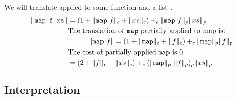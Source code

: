 %
We will translate  applied to some function  and a list .
%
\begin{align*}
  \|\T{map f xs}\| &= (1 + \|\T{map}\ f\|_c + \|xs\|_c) +_c \|\T{map}\ f\|_p \|xs\|_p \\
                   &\text{The translation of \T{map} partially applied to map is:}\\
                   &\quadthree \|\T{map}\ f\| = (1 + \|\T{map}\|_c + \|f\|_c) +_c \|\T{map}\|_p \|f\|_p \\
                   &\text{The cost of partially applied \T{map} is 0.} \\
                   &= (2 + \|f\|_c + \|xs\|_c) +_c (\|\T{map}\|_p\ \|f\|_p)_p \|xs\|_p
\end{align*}

\subsection{Interpretation}

